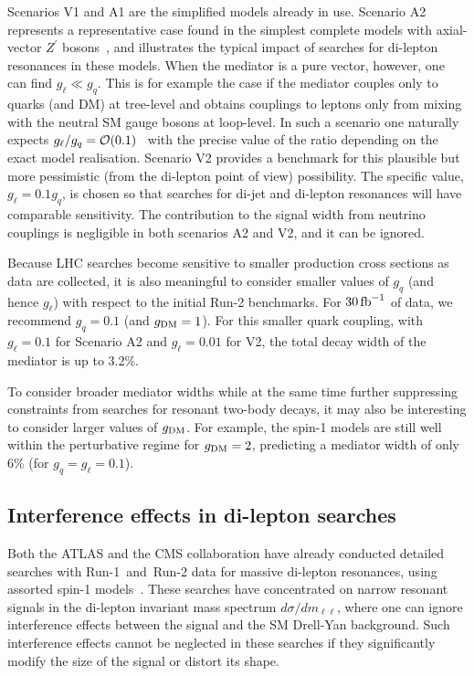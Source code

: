 \documentclass[a4paper, 11pt,notoc]{article}
\newcommand{\gDM}{\ensuremath{g_{\rm{DM}}}\xspace}
\newcommand{\gq}{\ensuremath{g_q}\xspace}
\begin{document}
Scenarios V1 and A1 are the simplified models already in use. Scenario A2 represents a representative case found in the simplest complete models with axial-vector $Z^\prime$ bosons~\cite{Kahlhoefer:2015bea}, 
and illustrates the typical impact of searches for di-lepton resonances in these models. When the mediator is a pure vector, however, one can find $g_\ell \ll g_q$. This is for example the case if the mediator couples only to quarks (and DM) at tree-level and  obtains couplings to leptons only from mixing with the neutral SM gauge bosons at loop-level. In such a scenario one naturally expects $g_\ell/g_q = {\cal O} (0.1)$~\cite{Duerr:2016tmh} with the precise value of the ratio depending on the exact model realisation. 
Scenario V2 provides a benchmark for this plausible but more pessimistic (from the di-lepton point of view) possibility. The specific value, $g_\ell = 0.1 g_q$, is chosen so that searches for di-jet and di-lepton resonances will have comparable sensitivity. The contribution to the signal width from neutrino couplings is negligible in both scenarios A2 and V2, and it can be ignored. 

Because LHC searches become sensitive to smaller production cross sections as data are collected, it is also meaningful to consider smaller values of $g_q$ (and hence $g_\ell$) with respect to the initial Run-2 benchmarks. For $30 \, {\rm fb}^{-1}$ of data, we recommend $\gq = 0.1$ (and $\gDM = 1$). For this smaller quark coupling, with $g_\ell = 0.1$ for Scenario A2 and $g_\ell = 0.01$ for V2, the total decay width of the mediator is up to 3.2\%. 

To consider broader mediator widths while at the same time further suppressing constraints from searches for resonant two-body decays, it may also be interesting to consider larger values of $\gDM$. For example, the spin-1 models are still well within the perturbative regime for $\gDM = 2$, predicting a mediator width of only 6\% (for $\gq = g_\ell = 0.1$).

\subsection{Interference effects in di-lepton searches}

Both the ATLAS and the CMS collaboration have already conducted detailed searches with Run-1~and~Run-2 data for massive di-lepton resonances, using assorted spin-1 models~\cite{Aad:2014cka,Khachatryan:2014fba,Aaboud:2016cth,Khachatryan:2016zqb,Khachatryan:2016qkc,Aaboud:2016cth}. These searches have concentrated on narrow resonant signals in the di-lepton invariant mass spectrum $d \sigma/d m_{\ell \ell}$, where one can ignore interference effects between the signal and the SM Drell-Yan background. Such interference 
effects cannot be neglected in these searches if 
they significantly modify the size of the signal or distort its shape. 
\end{document}
